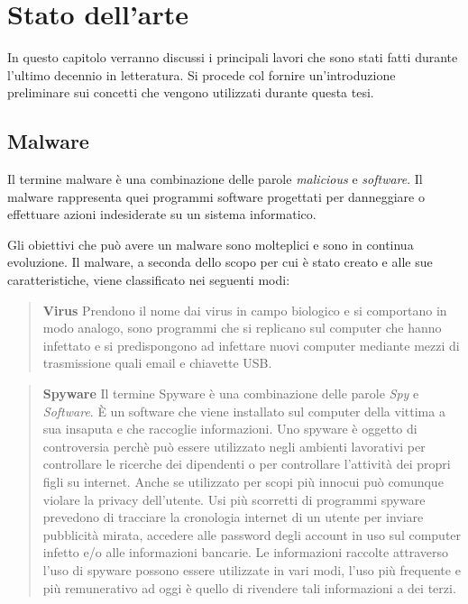 \documentclass[../main.tex]{subfiles}
\begin{document}
\chapter{Stato dell'arte}

In questo capitolo verranno discussi i principali lavori che sono stati fatti durante l'ultimo decennio in letteratura. Si procede col fornire un'introduzione preliminare sui concetti che vengono utilizzati durante questa tesi.

\section{Malware}
Il termine malware è una combinazione delle parole \textit{malicious} e \textit{software}. Il malware rappresenta quei programmi software progettati per danneggiare o effettuare azioni indesiderate su un sistema informatico. \cite{MalwareDef}

Gli obiettivi che può avere un malware sono molteplici e sono in continua evoluzione. Il malware, a seconda dello scopo per cui è stato creato e alle sue caratteristiche, viene classificato nei seguenti modi:

\begin{verse}
				\textbf{Virus} Prendono il nome dai virus in campo biologico e si comportano in modo analogo, sono programmi che si replicano sul computer che hanno infettato e si predispongono ad infettare nuovi computer mediante mezzi di trasmissione quali email e chiavette USB. \cite{VirusDef}
\end{verse}

\begin{verse}
				\textbf{Spyware} Il termine Spyware è una combinazione delle parole \textit{Spy} e \textit{Software}. È un software che viene installato sul computer della vittima a sua insaputa e che raccoglie informazioni. 
				Uno spyware è oggetto di controversia perchè può essere utilizzato negli ambienti lavorativi per controllare le ricerche dei dipendenti o per controllare l'attività dei propri figli su internet. Anche se utilizzato per scopi più innocui può comunque violare la privacy dell'utente. \cite{Spyware2} \newline
				Usi più scorretti di programmi spyware prevedono di tracciare la cronologia internet di un utente per inviare pubblicità mirata, accedere alle password degli account in uso sul computer infetto e/o alle informazioni bancarie. Le informazioni raccolte attraverso l'uso di spyware possono essere utilizzate in vari modi, l'uso più frequente e più remunerativo ad oggi è quello di rivendere tali informazioni a dei terzi. \cite{Spyware1}
\end{verse}
\end{document}
